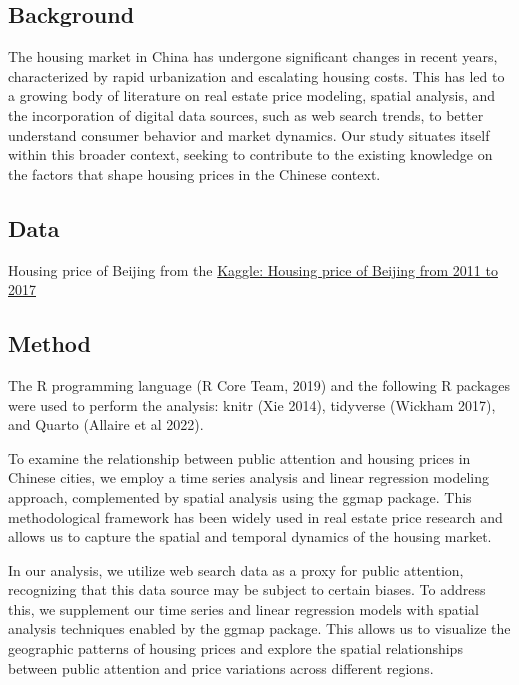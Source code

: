 \documentclass[
  letterpaper,
  DIV=11,
  numbers=noendperiod]{scrartcl}
\begin{document}
\subsection{Background}\label{background}

The housing market in China has undergone significant changes in recent
years, characterized by rapid urbanization and escalating housing costs.
This has led to a growing body of literature on real estate price
modeling, spatial analysis, and the incorporation of digital data
sources, such as web search trends, to better understand consumer
behavior and market dynamics. Our study situates itself within this
broader context, seeking to contribute to the existing knowledge on the
factors that shape housing prices in the Chinese context.

\subsection{Data}\label{data}

Housing price of Beijing from the
\href{https://www.kaggle.com/datasets/ruiqurm/lianjia}{Kaggle: Housing
price of Beijing from 2011 to 2017}

\subsection{Method}\label{method}

The R programming language (R Core Team, 2019) and the following R
packages were used to perform the analysis: knitr (Xie 2014), tidyverse
(Wickham 2017), and Quarto (Allaire et al 2022).

To examine the relationship between public attention and housing prices
in Chinese cities, we employ a time series analysis and linear
regression modeling approach, complemented by spatial analysis using the
ggmap package. This methodological framework has been widely used in
real estate price research and allows us to capture the spatial and
temporal dynamics of the housing market.

In our analysis, we utilize web search data as a proxy for public
attention, recognizing that this data source may be subject to certain
biases. To address this, we supplement our time series and linear
regression models with spatial analysis techniques enabled by the ggmap
package. This allows us to visualize the geographic patterns of housing
prices and explore the spatial relationships between public attention
and price variations across different regions.
\end{document}

